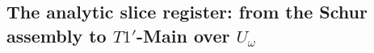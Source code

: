 %
%

\subsection{The analytic slice register: from the Schur assembly to
\texorpdfstring{$T1'$}{T1'}-Main over \texorpdfstring{$U_\omega$}{U-omega}}%
\label{an17:sec-slice}

